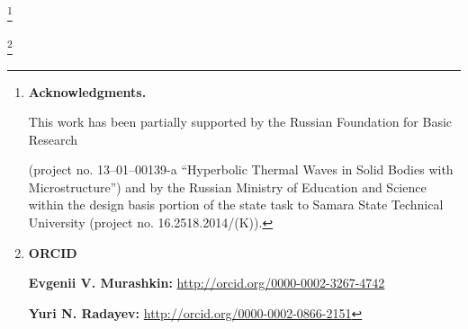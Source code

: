 \RuDate 



\newpage



\makeentitle







\thanks{\textbf{Acknowledgments.} 

This work has been partially supported by the Russian Foundation for Basic Research

 (project no. 13–01–00139-a ``Hyperbolic Thermal Waves in Solid Bodies with Microstructure'') and by the Russian Ministry of Education and Science within the  design basis portion  of the state task to Samara State Technical University (project no. 16.2518.2014/(K)).}



\newpage



\thanks{{\bf ORCID}



{\bf Evgenii V. Murashkin:} \url{http://orcid.org/0000-0002-3267-4742}



{\bf Yuri N. Radayev:} \url{http://orcid.org/0000-0002-0866-2151}





}





\EngRef





